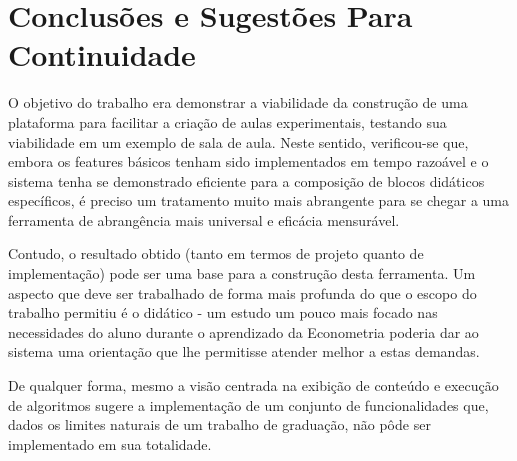 \documentclass{abnt}
\begin{document}
\chapter {Conclusões e Sugestões Para Continuidade}





O objetivo do trabalho era demonstrar a viabilidade da construção de uma plataforma para facilitar a criação de aulas experimentais, testando sua viabilidade em um exemplo de sala de aula. Neste sentido, verificou-se que, embora os features básicos tenham sido implementados em tempo razoável e o sistema tenha se demonstrado eficiente para a composição de blocos didáticos específicos, é preciso um tratamento muito mais abrangente para se chegar a uma ferramenta de abrangência mais universal e eficácia mensurável.

Contudo, o resultado obtido (tanto em termos de projeto quanto de implementação) pode ser uma base para a construção desta ferramenta. Um aspecto que deve ser trabalhado de forma mais profunda do que o escopo do trabalho permitiu é o didático - um estudo um pouco mais focado nas necessidades do aluno durante o aprendizado da Econometria poderia dar ao sistema uma orientação que lhe permitisse atender melhor a estas demandas.

De qualquer forma, mesmo a visão centrada na exibição de conteúdo e execução de algoritmos sugere a implementação de um conjunto de funcionalidades que, dados os limites naturais de um trabalho de graduação, não pôde ser implementado em sua totalidade.
\end{document}

